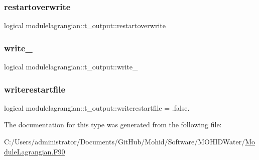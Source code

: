 \subsubsection{\texorpdfstring{restartoverwrite}{restartoverwrite}}
{\footnotesize\ttfamily logical modulelagrangian\+::t\+\_\+output\+::restartoverwrite\hspace{0.3cm}{\ttfamily [private]}}

\mbox{\label{structmodulelagrangian_1_1t__output_a2571c9dfaa99bd184cca1ea0819b318a}} 
\subsubsection{\texorpdfstring{write\+\_\+}{write\_}}
{\footnotesize\ttfamily logical modulelagrangian\+::t\+\_\+output\+::write\+\_\+\hspace{0.3cm}{\ttfamily [private]}}

\mbox{\label{structmodulelagrangian_1_1t__output_aba8c1648ae7b14de7cffd1d55978adce}} 
\subsubsection{\texorpdfstring{writerestartfile}{writerestartfile}}
{\footnotesize\ttfamily logical modulelagrangian\+::t\+\_\+output\+::writerestartfile = .false.\hspace{0.3cm}{\ttfamily [private]}}



The documentation for this type was generated from the following file\+:\begin{DoxyCompactItemize}
\item 
C\+:/\+Users/administrator/\+Documents/\+Git\+Hub/\+Mohid/\+Software/\+M\+O\+H\+I\+D\+Water/\mbox{\hyperlink{_module_lagrangian_8_f90}{Module\+Lagrangian.\+F90}}\end{DoxyCompactItemize}
